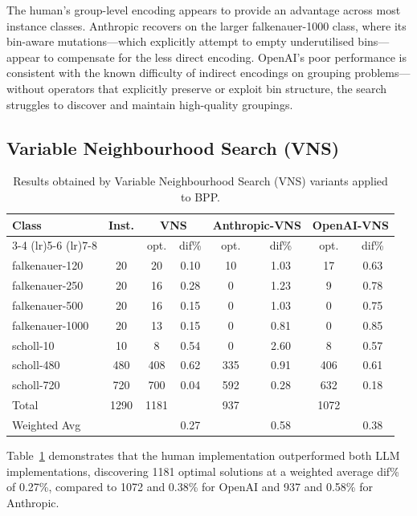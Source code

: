 \documentclass[11pt]{article}
\begin{document}
The human's group-level encoding appears to provide an advantage across most instance classes. Anthropic recovers on the larger falkenauer-1000 class, where its bin-aware mutations---which explicitly attempt to empty underutilised bins---appear to compensate for the less direct encoding. OpenAI's poor performance is consistent with the known difficulty of indirect encodings on grouping problems---without operators that explicitly preserve or exploit bin structure, the search struggles to discover and maintain high-quality groupings.

\subsection{Variable Neighbourhood Search (VNS)}
\begin{table}[H]
\centering
\caption{Results obtained by Variable Neighbourhood Search (VNS) variants applied to BPP.}
\label{tab:vns-comparison}
\begin{tabular}{l c cc cc cc}
\toprule
\multirow{2}{*}{Class} & \multirow{2}{*}{Inst.} & \multicolumn{2}{c}{VNS} & \multicolumn{2}{c}{Anthropic-VNS} & \multicolumn{2}{c}{OpenAI-VNS} \\
\cmidrule(lr){3-4} \cmidrule(lr){5-6} \cmidrule(lr){7-8}
 & & opt. & dif\% & opt. & dif\% & opt. & dif\% \\
\midrule
falkenauer-120  & 20   & 20   & 0.10 & 10   & 1.03 & 17   & 0.63 \\
falkenauer-250  & 20   & 16   & 0.28 & 0    & 1.23 & 9    & 0.78 \\
falkenauer-500  & 20   & 16   & 0.15 & 0    & 1.03 & 0    & 0.75 \\
falkenauer-1000 & 20   & 13   & 0.15 & 0    & 0.81 & 0    & 0.85 \\
scholl-10       & 10   & 8    & 0.54 & 0    & 2.60 & 8    & 0.57 \\
scholl-480      & 480  & 408  & 0.62 & 335  & 0.91 & 406  & 0.61 \\
scholl-720      & 720  & 700  & 0.04 & 592  & 0.28 & 632  & 0.18 \\
\midrule
Total           & 1290 & 1181 &      & 937  &      & 1072 &      \\
Weighted Avg    &      &      & 0.27 &      & 0.58 &      & 0.38 \\
\bottomrule
\end{tabular}
\end{table}

Table~\ref{tab:vns-comparison} demonstrates that the human implementation outperformed both LLM implementations, discovering 1181 optimal solutions at a weighted average dif\% of 0.27\%, compared to 1072 and 0.38\% for OpenAI and 937 and 0.58\% for Anthropic.
\end{document}
